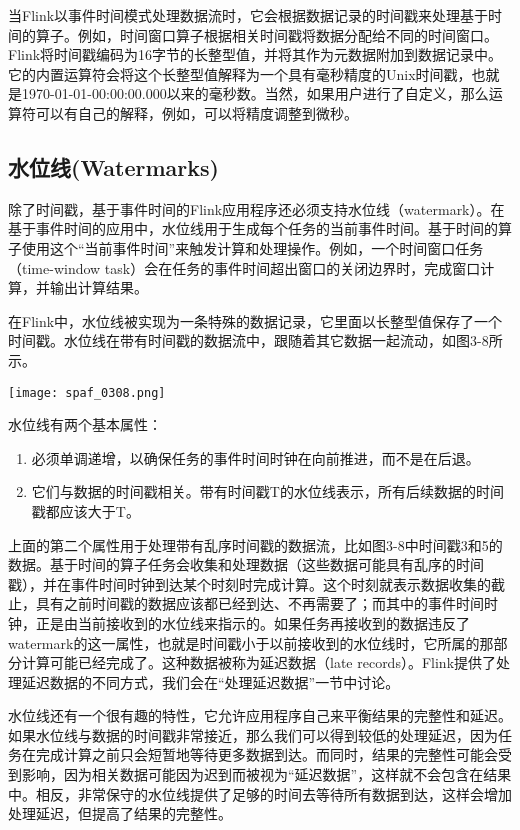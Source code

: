 \documentclass[oneside]{ctexbook}
\begin{document}
当Flink以事件时间模式处理数据流时，它会根据数据记录的时间戳来处理基于时间的算子。例如，时间窗口算子根据相关时间戳将数据分配给不同的时间窗口。Flink将时间戳编码为16字节的长整型值，并将其作为元数据附加到数据记录中。它的内置运算符会将这个长整型值解释为一个具有毫秒精度的Unix时间戳，也就是1970-01-01-00:00:00.000以来的毫秒数。当然，如果用户进行了自定义，那么运算符可以有自己的解释，例如，可以将精度调整到微秒。

\subsection{水位线(Watermarks)}

除了时间戳，基于事件时间的Flink应用程序还必须支持水位线（watermark）。在基于事件时间的应用中，水位线用于生成每个任务的当前事件时间。基于时间的算子使用这个“当前事件时间”来触发计算和处理操作。例如，一个时间窗口任务（time-window task）会在任务的事件时间超出窗口的关闭边界时，完成窗口计算，并输出计算结果。

在Flink中，水位线被实现为一条特殊的数据记录，它里面以长整型值保存了一个时间戳。水位线在带有时间戳的数据流中，跟随着其它数据一起流动，如图3-8所示。

\noindent \texttt{[image: spaf\_0308.png]}

水位线有两个基本属性：

\begin{enumerate}
  \item 必须单调递增，以确保任务的事件时间时钟在向前推进，而不是在后退。
  \item 它们与数据的时间戳相关。带有时间戳T的水位线表示，所有后续数据的时间戳都应该大于T。
\end{enumerate}

上面的第二个属性用于处理带有乱序时间戳的数据流，比如图3-8中时间戳3和5的数据。基于时间的算子任务会收集和处理数据（这些数据可能具有乱序的时间戳），并在事件时间时钟到达某个时刻时完成计算。这个时刻就表示数据收集的截止，具有之前时间戳的数据应该都已经到达、不再需要了；而其中的事件时间时钟，正是由当前接收到的水位线来指示的。如果任务再接收到的数据违反了watermark的这一属性，也就是时间戳小于以前接收到的水位线时，它所属的那部分计算可能已经完成了。这种数据被称为延迟数据（late records）。Flink提供了处理延迟数据的不同方式，我们会在“处理延迟数据”一节中讨论。

水位线还有一个很有趣的特性，它允许应用程序自己来平衡结果的完整性和延迟。如果水位线与数据的时间戳非常接近，那么我们可以得到较低的处理延迟，因为任务在完成计算之前只会短暂地等待更多数据到达。而同时，结果的完整性可能会受到影响，因为相关数据可能因为迟到而被视为“延迟数据”，这样就不会包含在结果中。相反，非常保守的水位线提供了足够的时间去等待所有数据到达，这样会增加处理延迟，但提高了结果的完整性。
\end{document}
